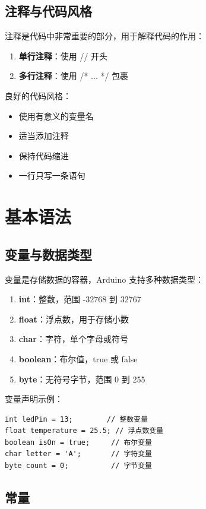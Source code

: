 \documentclass[12pt,UTF8]{ctexbook}
\begin{document}
\section{注释与代码风格}

注释是代码中非常重要的部分，用于解释代码的作用：

\begin{enumerate}
    \item \textbf{单行注释}：使用 // 开头
    \item \textbf{多行注释}：使用 /* ... */ 包裹
\end{enumerate}

良好的代码风格：
\begin{itemize}
    \item 使用有意义的变量名
    \item 适当添加注释
    \item 保持代码缩进
    \item 一行只写一条语句
\end{itemize}

\chapter{基本语法}

\section{变量与数据类型}

变量是存储数据的容器，Arduino 支持多种数据类型：

\begin{enumerate}
    \item \textbf{int}：整数，范围 -32768 到 32767
    \item \textbf{float}：浮点数，用于存储小数
    \item \textbf{char}：字符，单个字母或符号
    \item \textbf{boolean}：布尔值，true 或 false
    \item \textbf{byte}：无符号字节，范围 0 到 255
\end{enumerate}

变量声明示例：
\begin{lstlisting}
int ledPin = 13;        // 整数变量
float temperature = 25.5; // 浮点数变量
boolean isOn = true;     // 布尔变量
char letter = 'A';       // 字符变量
byte count = 0;          // 字节变量
\end{lstlisting}

\section{常量}
\end{document}
